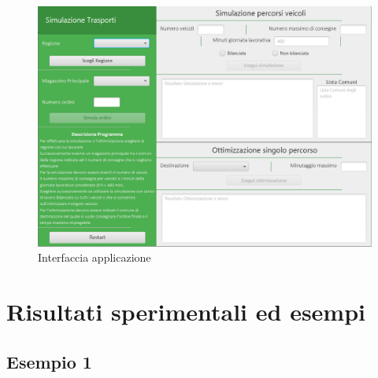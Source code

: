 \documentclass[a4paper,12pt]{report}
\begin{document}
\begin{figure}[h]
\label{fig:interfaccia}
\begin{center}
\includegraphics[width=0.8\paperwidth]{Images/Interfaccia.png} 
\caption{Interfaccia applicazione}
\end{center}
\end{figure}


\chapter{Risultati sperimentali ed esempi}
\section{Esempio 1}
\end{document}
